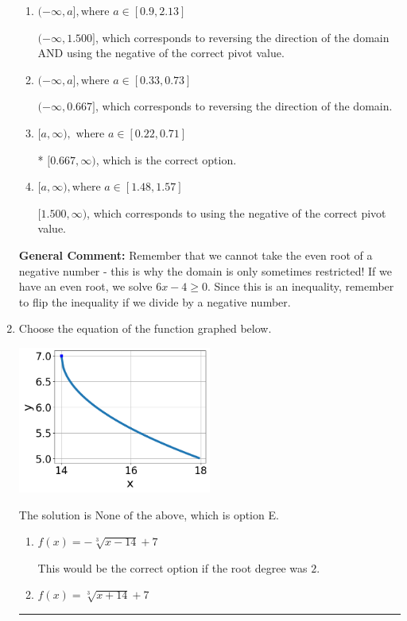 \documentclass{extbook}[14pt]
\newcommand{\litem}[1]{\item #1

\rule{\textwidth}{0.4pt}}
\begin{document}
\begin{enumerate}
{\begin{enumerate}[label=\Alph*.]
This corresponds to the radical having an odd power, but the radical for this question is even.
\item \( (-\infty, a], \text{where } a \in [0.9, 2.13] \)

$(-\infty, 1.500]$, which corresponds to reversing the direction of the domain AND using the negative of the correct pivot value.
\item \( (-\infty, a], \text{where } a \in [0.33, 0.73] \)

 $(-\infty, 0.667]$, which corresponds to reversing the direction of the domain.
\item \( [a, \infty), \text{ where } a \in [0.22, 0.71] \)

* $[0.667, \infty)$, which is the correct option.
\item \( [a, \infty), \text{where } a \in [1.48, 1.57] \)

$[1.500, \infty)$, which corresponds to using the negative of the correct pivot value.
\end{enumerate}

\textbf{General Comment:} Remember that we cannot take the even root of a negative number - this is why the domain is only sometimes restricted! If we have an even root, we solve $6 x - 4 \geq 0$. Since this is an inequality, remember to flip the inequality if we divide by a negative number.
}
\litem{
Choose the equation of the function graphed below.

\begin{center}
    \includegraphics[width=0.5\textwidth]{../Figures/radicalGraphToEquationCopyC.png}
\end{center}




The solution is \( \text{None of the above} \), which is option E.\begin{enumerate}[label=\Alph*.]
\item \( f(x) = - \sqrt[3]{x - 14} + 7 \)

This would be the correct option if the root degree was $2$.
\item \( f(x) = \sqrt[3]{x + 14} + 7 \)


\end{enumerate}}
\end{enumerate}
\end{document}
